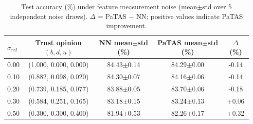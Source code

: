 \begin{table}[ht]
\centering
\caption{Test accuracy (\%) under feature measurement noise (mean$\pm$std over 5 independent noise draws). $\Delta$ = PaTAS $-$ NN; positive values indicate PaTAS improvement.}
\label{tab:feature-noise}
\begin{tabular}{lcccc}
\toprule
$\sigma_{rel}$ & Trust opinion $(b,d,u)$ & NN mean$\pm$std (\%) & PaTAS mean$\pm$std (\%) & $\Delta$ (\%) \\
\midrule
0.00 & (1.000, 0.000, 0.000) & 84.43$\pm$0.14 & 84.29$\pm$0.00 & -0.14 \\
0.10 & (0.882, 0.098, 0.020) & 84.30$\pm$0.07 & 84.16$\pm$0.06 & -0.14 \\
0.20 & (0.739, 0.185, 0.077) & 83.88$\pm$0.05 & 83.70$\pm$0.06 & -0.18 \\
0.30 & (0.584, 0.251, 0.165) & 83.18$\pm$0.15 & 83.24$\pm$0.13 & +0.06 \\
0.50 & (0.300, 0.300, 0.400) & 81.94$\pm$0.53 & 82.26$\pm$0.17 & +0.32 \\
\bottomrule
\end{tabular}
\end{table}